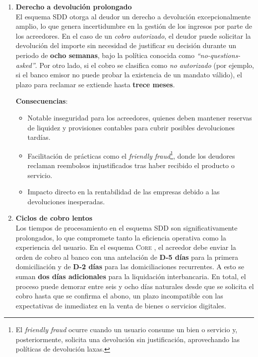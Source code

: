 \begin{enumerate}[label=\textbf{\arabic*.}, leftmargin=0.75cm]
  \item \textbf{Derecho a devolución prolongado}\\
        El esquema SDD otorga al deudor un derecho a devolución excepcionalmente amplio, lo que genera incertidumbre en la gestión de los ingresos por parte de los acreedores. En el caso de un \emph{cobro autorizado}, el deudor puede solicitar la devolución del importe sin necesidad de justificar su decisión durante un periodo de \textbf{ocho semanas}, bajo la política conocida como \emph{“no-questions-asked”}. Por otro lado, si el cobro se clasifica como \emph{no autorizado} (por ejemplo, si el banco emisor no puede probar la existencia de un mandato válido), el plazo para reclamar se extiende hasta \textbf{trece meses}.
        
        \textbf{Consecuencias}:
        \begin{itemize}
          \item Notable inseguridad para los acreedores, quienes deben mantener reservas de liquidez y provisiones contables para cubrir posibles devoluciones tardías.
          \item Facilitación de prácticas como el \emph{friendly fraud}\footnote{El \emph{friendly fraud} ocurre cuando un usuario consume un bien o servicio y, posteriormente, solicita una devolución sin justificación, aprovechando las políticas de devolución laxas.}, donde los deudores reclaman reembolsos injustificados tras haber recibido el producto o servicio.
          \item Impacto directo en la rentabilidad de las empresas debido a las devoluciones inesperadas.
        \end{itemize}

  \item \textbf{Ciclos de cobro lentos}\\
        Los tiempos de procesamiento en el esquema SDD son significativamente prolongados, lo que compromete tanto la eficiencia operativa como la experiencia del usuario. En el esquema \textsc{Core} \cite{epc016}, el acreedor debe enviar la orden de cobro al banco con una antelación de \textbf{D-5 días} para la primera domiciliación y de \textbf{D-2 días} para las domiciliaciones recurrentes. A esto se suman \textbf{dos días adicionales} para la liquidación interbancaria. En total, el proceso puede demorar entre seis y ocho días naturales desde que se solicita el cobro hasta que se confirma el abono, un plazo incompatible con las expectativas de inmediatez en la venta de bienes o servicios digitales.
        

\end{enumerate}
